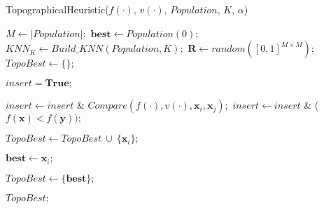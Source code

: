 \begin{breakablealgorithm}
\caption{TopographicalHeuristic($f(\cdot)$, $v(\cdot)$, $Population$, $K$, $\alpha$)}
\label{alg:TopographicalHeuristic}
\begin{spacing}{1.5}
\begin{algorithmic}[1]


\State $M \gets |Population|;$
\State $\bm{best} \gets Population(0);$
\State $KNN_K \gets Build\_KNN(Population, K);$
\State $\bm{R} \gets random([0, 1]^{M \times M});$
\State $TopoBest \gets \{\};$


\State $insert = \bm{True};$

		\State $insert \gets insert$ \& $Compare(f(\cdot), v(\cdot), \bm{x}_i, \bm{x}_j);$
	\Else
		\State $insert \gets insert$ \& ($f(\bm{x}) < f(\bm{y}));$
	\EndIf
\EndFor

\State $TopoBest \gets TopoBest \ \cup \ \{\bm{x}_i\};$
\EndIf

\State $\bm{best} \gets \bm{x}_i;$
\EndIf
\EndFor

	\State $TopoBest \gets \{\bm{best}\};$
\EndIf

\State \Return $TopoBest;$



\end{algorithmic}
\end{spacing}
\end{breakablealgorithm}